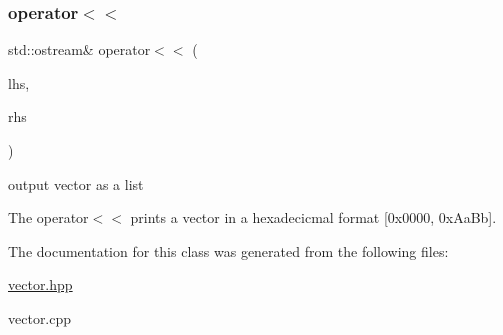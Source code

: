 \subsubsection{\texorpdfstring{operator$<$$<$}{operator<<}}
{\footnotesize\ttfamily std\+::ostream\& operator$<$$<$ (\begin{DoxyParamCaption}\item[{std\+::ostream \&}]{lhs,  }\item[{const \hyperlink{classvector}{vector} \&}]{rhs }\end{DoxyParamCaption})\hspace{0.3cm}{\ttfamily [friend]}}



output vector as a list 

The operator$<$$<$ prints a vector in a hexadecicmal format \mbox{[}0x0000, 0x\+Aa\+Bb\mbox{]}. 

The documentation for this class was generated from the following files\+:\begin{DoxyCompactItemize}
\item 
\hyperlink{vector_8hpp}{vector.\+hpp}\item 
vector.\+cpp\end{DoxyCompactItemize}
